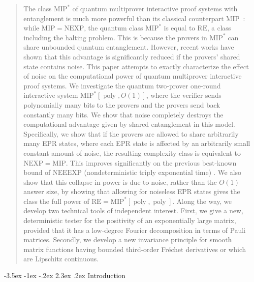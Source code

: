 \documentclass[11pt]{article}
\makeatletter
\renewcommand{\section}{\@startsection {section}{1}{\z@}%
             {-3.5ex \@plus -1ex \@minus -.2ex}%
             {2.3ex \@plus .2ex}%
             {\normalfont\Large\scshape\bfseries}}
\theoremstyle{plain}
\theoremstyle{definition}
\newcommand {\Br} [1] {\ensuremath{ \left[ #1 \right] }}
\newcommand{\poly} {\ensuremath{\operatorname{poly}}}
\newcommand{\1}{\mathbb{1}} %
\newcommand{\MIP}{\mathrm{MIP}}
\newcommand{\RE}{\mathrm{RE}}
\makeatother
\begin{document}
\begin{abstract}
%
The class $\MIP^*$ of quantum multiprover interactive proof systems with entanglement is much more powerful than its classical counterpart $\mathrm{MIP}$~\cite{Babai1991, JNVWYuen'20, JNVWY'20}: while $\MIP = \mathrm{NEXP}$, the quantum class $\MIP^*$ is equal to $\RE$, a class including the halting problem. This is because the provers in $\MIP^*$ can share unbounded quantum entanglement. However, recent works \cite{qin2021nonlocal,qin_et_al:LIPIcs.ICALP.2023.97} have shown that this advantage is significantly reduced if the provers' shared state contains noise. This paper attempts to exactly characterize the effect of noise on the computational power of quantum multiprover interactive proof systems. We investigate the quantum two-prover one-round interactive system $\mathrm{MIP}^*\Br{\poly,O(1)}$, where the verifier sends polynomially many bits to the provers and the provers send back constantly many bits. We show that noise completely destroys the computational advantage given by shared entanglement in this model. Specifically, we show that if the provers are allowed to share arbitrarily many EPR states, where each EPR state is affected by an arbitrarily small constant amount of noise, the resulting complexity class is equivalent to $\mathrm{NEXP} = \mathrm{MIP}$. This improves significantly on the previous best-known bound of $\mathrm{NEEEXP}$ (nondeterministic triply exponential time) \cite{qin2021nonlocal}. We also show that this collapse in power is due to noise, rather than the $O(1)$ answer size, by showing that allowing for noiseless EPR states gives the class the full power of $\RE = \MIP^*\Br{\poly, \poly}$. Along the way, we develop two technical tools of independent interest. First, we give a new, deterministic tester for the positivity of an exponentially large matrix, provided that it has a low-degree Fourier decomposition in terms of Pauli matrices. Secondly, we develop a new invariance principle for smooth matrix functions having bounded third-order Fr\'echet derivatives or which are Lipschitz continuous.
\end{abstract}

\newpage
\tableofcontents


%
%
 \section{Introduction}
\end{document}
